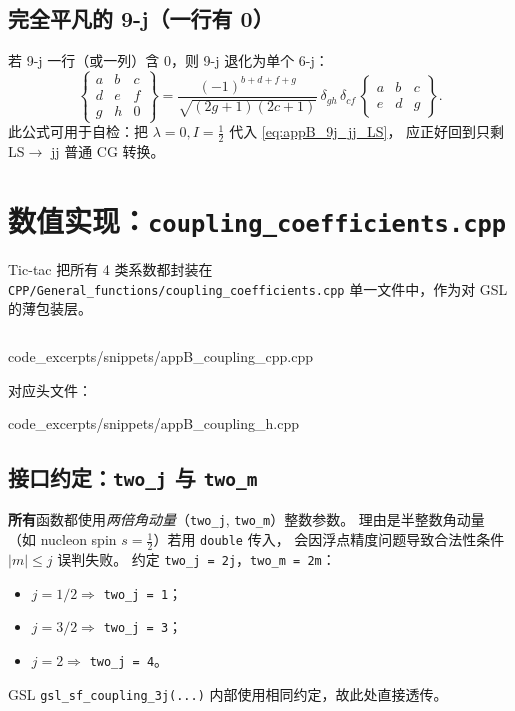 \subsection{完全平凡的 9-j（一行有 0）}

若 9-j 一行（或一列）含 0，则 9-j 退化为单个 6-j：
\begin{equation}
\begin{Bmatrix}
a & b & c \\ d & e & f \\ g & h & 0
\end{Bmatrix}
= \frac{(-1)^{b+d+f+g}}{\sqrt{(2g+1)(2c+1)}}
\,\delta_{g h}\,\delta_{c f}\,
\begin{Bmatrix} a & b & c \\ e & d & g \end{Bmatrix}.
\end{equation}
此公式可用于自检：把 $\lambda = 0, I = \tfrac{1}{2}$ 代入 \cref{eq:appB_9j_jj_LS}，
应正好回到只剩 LS$\to$ jj 普通 CG 转换。

\section{数值实现：\texttt{coupling\_coefficients.cpp}}
\label{sec:appB_implementation}

Tic-tac 把所有 4 类系数都封装在 \texttt{CPP/General\_functions/coupling\_coefficients.cpp}
单一文件中，作为对 GSL 的薄包装层。
\begin{lstlisting}[style=cpp, caption={\texttt{coupling\_coefficients.cpp}（自动抽取）},
                   label={lst:appB_coupling_cpp}]
\end{lstlisting}

                {code_excerpts/snippets/appB_coupling_cpp.cpp}

\noindent
对应头文件：

                {code_excerpts/snippets/appB_coupling_h.cpp}

\subsection{接口约定：\texttt{two\_j} 与 \texttt{two\_m}}

\textbf{所有}函数都使用\emph{两倍角动量}（\texttt{two\_j}, \texttt{two\_m}）整数参数。
理由是半整数角动量
（如 nucleon spin $s = \tfrac{1}{2}$）若用 \texttt{double} 传入，
会因浮点精度问题导致合法性条件 $|m| \le j$ 误判失败。
约定 \texttt{two\_j = 2j}，\texttt{two\_m = 2m}：
\begin{itemize}
\item $j = 1/2 \Rightarrow$ \texttt{two\_j = 1}；
\item $j = 3/2 \Rightarrow$ \texttt{two\_j = 3}；
\item $j = 2 \Rightarrow$ \texttt{two\_j = 4}。
\end{itemize}
GSL \texttt{gsl\_sf\_coupling\_3j(...)} 内部使用相同约定，故此处直接透传。

